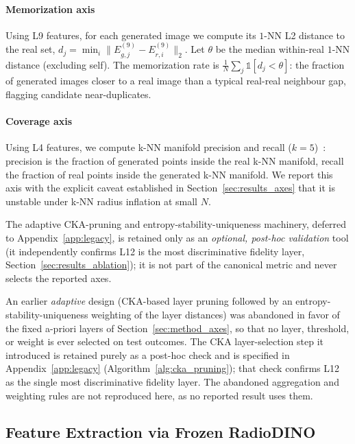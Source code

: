 \documentclass[lettersize,journal]{IEEEtran}
\begin{document}
\paragraph{Memorization axis}
Using L9 features, for each generated image we compute its $1$-NN L2
distance to the real set, $d_j = \min_i \lVert E_{g,j}^{(9)} - E_{r,i}^{(9)} \rVert_2$.
Let $\theta$ be the median within-real $1$-NN distance (excluding self).
The memorization rate is $\frac{1}{N}\sum_j \mathbb{1}[d_j < \theta]$: the
fraction of generated images closer to a real image than a typical
real-real neighbour gap, flagging candidate near-duplicates.

\paragraph{Coverage axis}
Using L4 features, we compute k-NN manifold precision and recall
($k=5$)~\cite{kynkaanniemi2019pr}: precision is the fraction of generated
points inside the real k-NN manifold, recall the fraction of real points
inside the generated k-NN manifold. We report this axis with the explicit
caveat established in Section~\ref{sec:results_axes} that it is unstable
under k-NN radius inflation at small $N$.

The adaptive CKA-pruning and entropy-stability-uniqueness machinery,
deferred to Appendix~\ref{app:legacy}, is retained only as an
\emph{optional, post-hoc validation} tool (it independently confirms L12 is
the most discriminative fidelity layer, Section~\ref{sec:results_ablation});
it is not part of the canonical metric and never selects the reported axes.

An earlier \emph{adaptive} design (CKA-based layer pruning followed by an entropy-stability-uniqueness weighting of the layer distances) was abandoned in favor of the fixed a-priori layers of Section~\ref{sec:method_axes}, so that no layer, threshold, or weight is ever selected on test outcomes. The CKA layer-selection step it introduced is retained purely as a post-hoc check and is specified in Appendix~\ref{app:legacy} (Algorithm~\ref{alg:cka_pruning}); that check confirms L12 as the single most discriminative fidelity layer. The abandoned aggregation and weighting rules are not reproduced here, as no reported result uses them.

\subsection{Feature Extraction via Frozen RadioDINO}
\label{sec:method_backbone}
\end{document}
